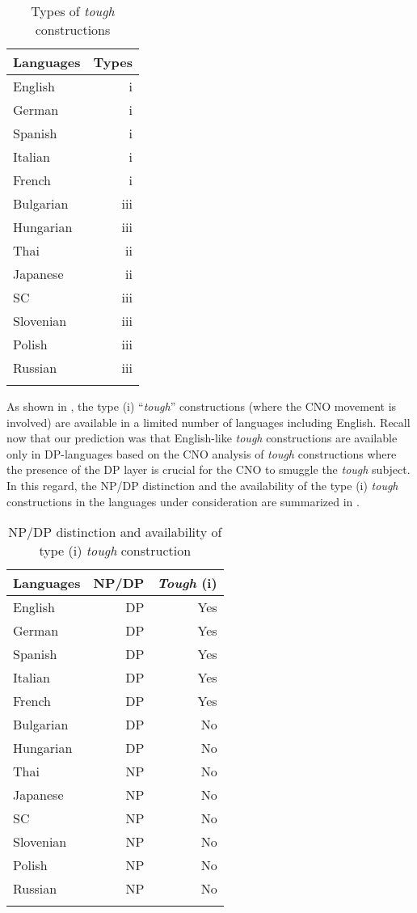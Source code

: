 \documentclass[output=paper,colorlinks,citecolor=brown,
]{langscibook}
\begin{document}
\begin{table}
\caption{Types of \textit{tough} constructions}
\label{tab:1:types}
 \begin{tabular}{l r}
  \lsptoprule
  Languages  & Types\\
  \midrule
  English  &   i  \\
  German  &   i\\
  Spanish & i\\
  Italian & i\\
  French & i\\
  Bulgarian & iii\\
  Hungarian & iii\\
  Thai & ii\\
  Japanese & ii\\
  SC & iii\\
  Slovenian & iii\\
  Polish & iii\\
  Russian & iii\\
  \lspbottomrule
 \end{tabular}
\end{table}

As shown in , the type (i) “\textit{tough}” constructions (where the CNO movement is involved) are available in a limited number of languages including English. Recall now that our prediction was that English-like \textit{tough} constructions are available only in DP-languages based on the CNO analysis of \textit{tough} constructions where the presence of the DP layer is crucial for the CNO to smuggle the \textit{tough} subject. In this regard, the NP/DP distinction and the availability of the type (i) \textit{tough} constructions in the languages under consideration are summarized in . 

\begin{table}
\caption{NP/DP distinction and availability of type (i) \emph{tough} construction}
\label{tab:2:npdp}
 \begin{tabular}{l rr}
  \lsptoprule
     {Languages}  & {NP/DP} & {\textit{Tough} (i)}\\
  \midrule
  English  &   DP  &    Yes  \\
  German  &   DP &   Yes  \\
    Spanish  &   DP &   Yes  \\
    Italian  &   DP &   Yes  \\
    French  &   DP &   Yes  \\
    Bulgarian  &   DP &   No  \\
    Hungarian  &   DP &   No  \\
    Thai  &   NP &   No  \\
    Japanese  &   NP &   No  \\
    SC  &   NP &   No  \\
    Slovenian  &   NP &   No  \\
    Polish  &   NP &   No  \\
    Russian  &   NP &   No  \\
  \lspbottomrule
 \end{tabular}
\end{table}
\end{document}
